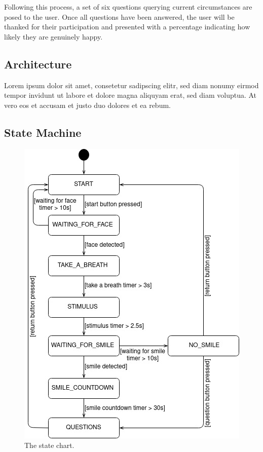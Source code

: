 Following this process, a set of six questions querying current circumstances are posed to the user. Once all questions have been answered, the user will be thanked for their participation and presented with a percentage indicating how likely they are genuinely happy.

\subsection{Architecture}
Lorem ipsum dolor sit amet, consetetur sadipscing elitr, sed diam nonumy eirmod tempor invidunt ut labore et dolore magna aliquyam erat, sed diam voluptua. At vero eos et accusam et justo duo dolores et ea rebum.

\subsection{State Machine}

\begin{figure}
  \includegraphics[width=\linewidth]{figures/state_chart.jpg}
  \caption{The state chart.}
  \label{fig:state_chart}
\end{figure}


